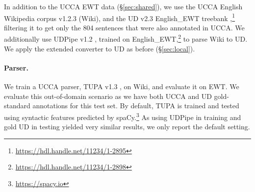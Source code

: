 \documentclass[11pt,a4paper,table]{article}
\begin{document}
In addition to the UCCA EWT data (\S\ref{sec:shared}),
we use the UCCA English Wikipedia corpus v1.2.3 (Wiki),
and the UD v2.3 English\_EWT treebank
\cite{11234/1-2895},\footnote{\url{https://hdl.handle.net/11234/1-2895}}
filtering it to get only the 804 sentences that were also annotated in UCCA.
We additionally use UDPipe v1.2 \cite{udpipe,udpipe:2017},
trained on
English\_EWT,\footnote{\url{https://hdl.handle.net/11234/1-2898}}
to parse Wiki to UD.
We apply the extended converter to UD as before (\S\ref{sec:local}).

\paragraph{Parser.}

We train a UCCA parser,
TUPA v1.3 \cite{hershcovich2017a,hershcovich2018multitask},
on Wiki, and evaluate it on EWT.
We evaluate this out-of-domain scenario as
we have both UCCA and UD gold-standard annotations for this test set.
By default, TUPA is trained and tested using syntactic features
predicted by spaCy.\footnote{\url{https://spacy.io}}
As using UDPipe in training and gold UD in testing yielded very similar
results, we only report the default setting.

%
\end{document}
